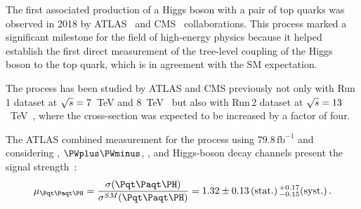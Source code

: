 \begin{comment}
\begin{figure}
\centering
\begin{subfigure}{.45\textwidth}
  \centering
  \texttt{[image: Chapter1/ttH\_Feynman\_A]}
  \caption{}
  \label{fig:Chap1:ttH:Feynman:A}
\end{subfigure}%
\begin{subfigure}{.45\textwidth}
  \centering
  \texttt{[image: Chapter1/ttH\_Feynman\_B]}
  \caption{}
  \label{fig:Chap1:ttH:tFeynman:B}
\end{subfigure}%
\caption{LO Feynman diagrams for \ttH production. Although this is the most 
relevant mechanism for the associated production of a Higgs boson with, at least, one top quark, 
the \ttH is still a rare process. 
The \ttH accounts for roughly 1\% of all Higgs-boson production and it cross-section is a factor 100 
smaller than the $\Pgluon\Pgluon\text{F}$, as can be seen in Figure~\ref{fig:Chap1:Higgs:CrossSection:In}.}
\label{fig:Chap1:ttH:Feynman}
\end{figure}
\end{comment}


The first associated production of a Higgs boson with a pair of top 
quarks was observed in 2018 by ATLAS~\cite{ATLAS:2018mme} 
and CMS~\cite{CMS:2018uxb} collaborations. %
This process marked a significant milestone for the field of high-energy 
physics because it helped establish the first direct 
measurement of the tree-level coupling of the Higgs boson 
to the top quark, which is in agreement with the SM expectation.

The \ttH process has been studied by ATLAS and CMS previously
not only with Run$\,$1 dataset at $\sqrt{s}=7$~TeV and $8$~TeV~\cite{ATLAS:2014ayi, CMS:2014tll} 
but also with Run$\,$2 dataset at $\sqrt{s}=13$~TeV~\cite{ATLAS:2018mme, CMS:2018uxb}, where the cross-section was expected 
to be increased by a factor of four. 

The ATLAS combined measurement for the \ttH process using $79.8\,\text{fb}^{-1}$
and considering \bbbar, $\PWplus \PWminus$, \Ptauon\APtauon, \Pgamma\Pgamma and \PZ\PZ
Higgs-boson decay channels present the signal strength~\cite{ATLAS:2018mme}:
\begin{equation*}
	\mu_{\ttH} = \frac{\sigma(\ttH)}{\sigma^{SM}(\ttH)} = 1.32 \pm 0.13\,(\text{stat.})\, ^{+0.17} _{-0.15} (\text{syst.})\, .
\end{equation*}

